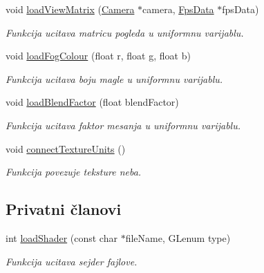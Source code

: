 \begin{DoxyCompactItemize}
void \hyperlink{classshader_1_1SkyboxShader_ad9d6069bb62fc7b3bfb6e8ee0bfe8784}{load\+View\+Matrix} (\hyperlink{classentity_1_1Camera}{Camera} $\ast$camera, \hyperlink{classutility_1_1FpsData}{Fps\+Data} $\ast$fps\+Data)
\begin{DoxyCompactList}\small\item\em Funkcija ucitava matricu pogleda u uniformnu varijablu. \end{DoxyCompactList}\item 
void \hyperlink{classshader_1_1SkyboxShader_ab265c7bade726b97b9fb06aa2f7d94df}{load\+Fog\+Colour} (float r, float g, float b)
\begin{DoxyCompactList}\small\item\em Funkcija ucitava boju magle u uniformnu varijablu. \end{DoxyCompactList}\item 
void \hyperlink{classshader_1_1SkyboxShader_a7f82a4e1c953df83dddb6760c83742a1}{load\+Blend\+Factor} (float blend\+Factor)
\begin{DoxyCompactList}\small\item\em Funkcija ucitava faktor mesanja u uniformnu varijablu. \end{DoxyCompactList}\item 
void \hyperlink{classshader_1_1SkyboxShader_a0ec32687208276708275f34f589c5b44}{connect\+Texture\+Units} ()
\begin{DoxyCompactList}\small\item\em Funkcija povezuje teksture neba. \end{DoxyCompactList}\end{DoxyCompactItemize}
\subsection*{Privatni članovi}
\begin{DoxyCompactItemize}
\item 
int \hyperlink{classshader_1_1SkyboxShader_a3d221aee6e11f91ea59332956e5edcbb}{load\+Shader} (const char $\ast$file\+Name, G\+Lenum type)
\begin{DoxyCompactList}\small\item\em Funkcija ucitava sejder fajlove. \end{DoxyCompactList}\end{DoxyCompactItemize}
